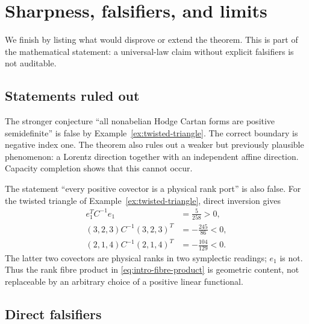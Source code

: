 \documentclass[11pt,a4paper]{amsart}
\theoremstyle{plain}
\theoremstyle{definition}
\begin{document}
\section{Sharpness, falsifiers, and limits}\label{sec:scope}

We finish by listing what would disprove or extend the theorem.  This is part of the mathematical
statement: a universal-law claim without explicit falsifiers is not auditable.

\subsection{Statements ruled out}

The stronger conjecture ``all nonabelian Hodge Cartan forms are positive semidefinite'' is false by
Example~\ref{ex:twisted-triangle}.  The correct boundary is negative index one.  The theorem also
rules out a weaker but previously plausible phenomenon: a Lorentz direction together with an
independent affine direction.  Capacity completion shows that this cannot occur.

The statement ``every positive covector is a physical rank port'' is also false.  For the twisted
triangle of Example~\ref{ex:twisted-triangle}, direct inversion gives
\[
 \begin{aligned}
 e_1^TC^{-1}e_1&=\frac5{258}>0,\\
 (3,2,3)C^{-1}(3,2,3)^T&=-\frac{245}{86}<0,\\
 (2,1,4)C^{-1}(2,1,4)^T&=-\frac{104}{129}<0.
 \end{aligned}
\]
The latter two covectors are physical ranks in two symplectic readings; $e_1$ is not.  Thus the
rank fibre product in \eqref{eq:intro-fibre-product} is geometric content, not replaceable by an
arbitrary choice of a positive linear functional.

\subsection{Direct falsifiers}
\end{document}
